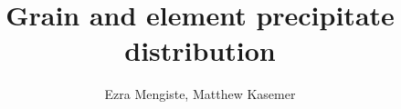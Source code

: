 \documentclass[20pt]{beamer} %
\title{Grain and element precipitate distribution}
\author{Ezra Mengiste, Matthew Kasemer}
\begin{document}
\newcommand{\chilCol}{grey}
\maketitle

\newcommand{\makeDataslide}[2]{
\begin{frame}{SERDP: RCL = #1.#2}

    \begin{columns}
        \begin{column}{0.1\textwidth}
        \begin{block}{\textbf{$\tau_{crss}$}}
        \texttt{[image: /layer\_1\_inv/imgs/mesh\_rcl0\_49\_step0-scale3d.png]}            
        \end{block}            
        \end{column}
        
        \begin{column}{0.3\textwidth}
        \begin{block}{Step 0}            
            \begin{figure}
                \texttt{[image: layer\_1\_inv/imgs/mesh\_rcl\#1\_\#2\_step0.png]}  
                \texttt{[image: layer\_1/imgs/mesh\_rcl\#1\_\#2\_step0.png]}              
            \end{figure}  
        \end{block}
 
        \end{column}
        \begin{column}{0.3\textwidth}
        \begin{block}{Step 16 $\varepsilon=0.26$}
            \begin{figure}
                \texttt{[image: layer\_1\_inv/imgs/mesh\_rcl\#1\_\#2\_step16.png]}  
                \texttt{[image: layer\_1/imgs/mesh\_rcl\#1\_\#2\_step16.png]}  
            
            \end{figure}                      
        \end{block}
        \end{column}
        \begin{column}{0.3\textwidth}
        \begin{figure}
            \texttt{[image: layer\_1\_inv/imgs/mesh\_rcl\#1\_\#2\_svs.png]}  
            \texttt{[image: layer\_1/imgs/mesh\_rcl\#1\_\#2\_svs.png]}  
        \end{figure}                
        \end{column}
    \end{columns}
\end{frame}

}
\end{document}
